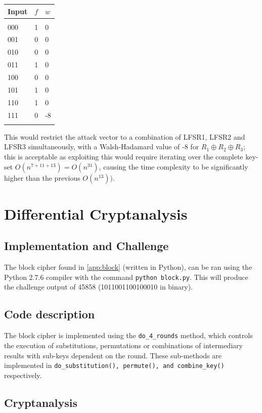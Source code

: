 \documentclass[british,11pt,a4paper]{article}
\begin{document}
\begin{center}
	\begin{tabular}{@{}lll@{}}\label{tab:walsh2} \\
		Input & \(f\) & \(w\) \\
		\midrule \\
		000   & 1     & 0     \\
		001   & 0     & 0     \\
		010   & 0     & 0     \\
		011   & 1     & 0     \\
		100   & 0     & 0     \\
		101   & 1     & 0     \\
		110   & 1     & 0     \\
		111   & 0     & -8    \\
		\bottomrule \\
	\end{tabular}
\end{center}
This would restrict the attack vector to a combination of LFSR1, LFSR2 and LFSR3 simultaneously, with a Walsh-Hadamard value of -8 for \(R_1 \oplus R_2 \oplus R_3\); this is acceptable as exploiting
this would require iterating over the complete key-set \(O(n^{7+11+13}) = O(n^{31})\), causing the time complexity to be significantly higher than the previous \(O(n^{13}))\).
\clearpage
\section{Differential Cryptanalysis}
\subsection{Implementation and Challenge}
The block cipher found in \autoref{app:block} (written in Python),
can be ran using the Python 2.7.6 compiler with the command \lstinline{python block.py}. This will produce the
challenge output of 45858 (1011001100100010 in binary).
\subsection{Code description}
The block cipher is implemented using the \lstinline{do_4_rounds} method, which controls the execution of substitutions, permutations or combinations
of intermediary results with sub-keys dependent on the round. These sub-methods are implemented in \lstinline{do_substitution(), permute(), and combine_key()} respectively.
\subsection{Cryptanalysis}
\end{document}
